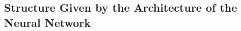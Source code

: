 %
%
%




\subsection{Structure Given by the Architecture of the Neural Network}
\label{subsection:ch1-introducing_structured_into_the_architecture_of_neural_networks}

%
%


